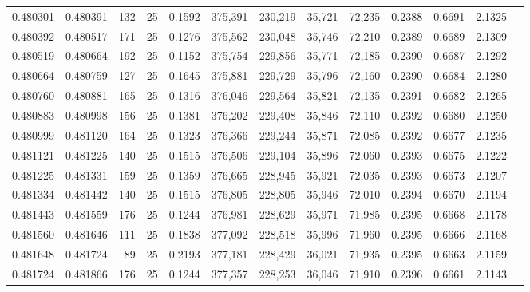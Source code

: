 \begin{tabular}{rrrrrrrrrrrrr}
0.480301 & 0.480391 &   132 &  25 &                                     0.1592 & 375,391 & 230,219 &  35,721 &  72,235 & 0.2388 & 0.6691 & 2.1325 \\
0.480392 & 0.480517 &   171 &  25 &                                     0.1276 & 375,562 & 230,048 &  35,746 &  72,210 & 0.2389 & 0.6689 & 2.1309 \\
0.480519 & 0.480664 &   192 &  25 &                                     0.1152 & 375,754 & 229,856 &  35,771 &  72,185 & 0.2390 & 0.6687 & 2.1292 \\
0.480664 & 0.480759 &   127 &  25 &                                     0.1645 & 375,881 & 229,729 &  35,796 &  72,160 & 0.2390 & 0.6684 & 2.1280 \\
0.480760 & 0.480881 &   165 &  25 &                                     0.1316 & 376,046 & 229,564 &  35,821 &  72,135 & 0.2391 & 0.6682 & 2.1265 \\
0.480883 & 0.480998 &   156 &  25 &                                     0.1381 & 376,202 & 229,408 &  35,846 &  72,110 & 0.2392 & 0.6680 & 2.1250 \\
0.480999 & 0.481120 &   164 &  25 &                                     0.1323 & 376,366 & 229,244 &  35,871 &  72,085 & 0.2392 & 0.6677 & 2.1235 \\
0.481121 & 0.481225 &   140 &  25 &                                     0.1515 & 376,506 & 229,104 &  35,896 &  72,060 & 0.2393 & 0.6675 & 2.1222 \\
0.481225 & 0.481331 &   159 &  25 &                                     0.1359 & 376,665 & 228,945 &  35,921 &  72,035 & 0.2393 & 0.6673 & 2.1207 \\
0.481334 & 0.481442 &   140 &  25 &                                     0.1515 & 376,805 & 228,805 &  35,946 &  72,010 & 0.2394 & 0.6670 & 2.1194 \\
0.481443 & 0.481559 &   176 &  25 &                                     0.1244 & 376,981 & 228,629 &  35,971 &  71,985 & 0.2395 & 0.6668 & 2.1178 \\
0.481560 & 0.481646 &   111 &  25 &                                     0.1838 & 377,092 & 228,518 &  35,996 &  71,960 & 0.2395 & 0.6666 & 2.1168 \\
0.481648 & 0.481724 &    89 &  25 &                                     0.2193 & 377,181 & 228,429 &  36,021 &  71,935 & 0.2395 & 0.6663 & 2.1159 \\
0.481724 & 0.481866 &   176 &  25 &                                     0.1244 & 377,357 & 228,253 &  36,046 &  71,910 & 0.2396 & 0.6661 & 2.1143 \\

\end{tabular}

